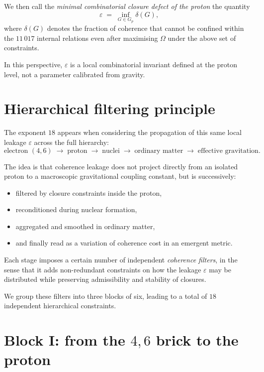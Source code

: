 \documentclass[11pt,a4paper]{article}
\begin{document}
\medskip

\noindent
We then call the \emph{minimal combinatorial closure defect of the proton}
the quantity
\[
  \varepsilon \;=\; \inf_{G \in G_p} \delta(G),
\]
where $\delta(G)$ denotes the fraction of coherence that cannot be confined
within the $11\,017$ internal relations even after maximising $\Omega$ under
the above set of constraints.

In this perspective, $\varepsilon$ is a local combinatorial invariant defined
at the proton level, not a parameter calibrated from gravity.

\section{Hierarchical filtering principle}

The exponent $18$ appears when considering the propagation of this same local
leakage $\varepsilon$ across the full hierarchy:
\begin{equation*}
  \text{electron }(4,6) \;\longrightarrow\; \text{proton} \;\longrightarrow\;
  \text{nuclei} \;\longrightarrow\; \text{ordinary matter} 
  \;\longrightarrow\; \text{effective gravitation}.
\end{equation*}

The idea is that coherence leakage does not project directly from an isolated
proton to a macroscopic gravitational coupling constant, but is successively:
\begin{itemize}
  \item filtered by closure constraints inside the proton,
  \item reconditioned during nuclear formation,
  \item aggregated and smoothed in ordinary matter,
  \item and finally read as a variation of coherence cost in an emergent metric.
\end{itemize}

Each stage imposes a certain number of independent \emph{coherence filters},
in the sense that it adds non-redundant constraints on how the leakage
$\varepsilon$ may be distributed while preserving admissibility and stability
of closures.

We group these filters into three blocks of six, leading to a total of $18$
independent hierarchical constraints.

\section{Block I: from the \texorpdfstring{$4,6$}{4,6} brick to the proton}
\label{sec:blockI}
\end{document}
